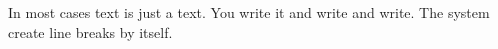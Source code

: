 \documentclass{article}
\begin{document}
\vspace*{\fill} \vspace*{-5ex}

In most cases text is just a text. You write it and write and write. The system create line breaks by itself.

\vspace*{\fill}
\end{document}
